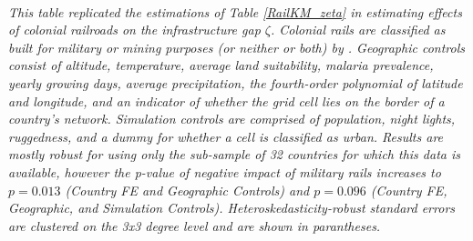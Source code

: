 \documentclass[11pt, oneside]{article}   	%
\begin{document}
\begin{table}[]
\justify
\textit{\\ \footnotesize This table replicated the estimations of Table \eqref{RailKM_zeta} in estimating effects of colonial railroads on the infrastructure gap $\zeta$. Colonial rails are classified as built for military or mining purposes (or neither or both) by \cite{jedwab_permanent_2016}. Geographic controls consist of altitude, temperature, average land suitability, malaria prevalence, yearly growing days, average precipitation, the fourth-order polynomial of latitude and longitude, and an indicator of whether the grid cell lies on the border of a country's network. Simulation controls are comprised of population, night lights, ruggedness, and a dummy for whether a cell is classified as urban. Results are mostly robust for using only the sub-sample of 32 countries for which this data is available, however the p-value of negative impact of military rails increases to $p=0.013$ (Country FE and Geographic Controls) and $p=0.096$ (Country FE, Geographic, and Simulation Controls). Heteroskedasticity-robust standard errors are clustered on the 3x3 degree level and are shown in parantheses.}
\end{table}




\newpage
\begin{spacing}{1.0}
\setlength{\bibsep}{2.5pt plus 1.5ex}

\end{spacing}
\end{document}
